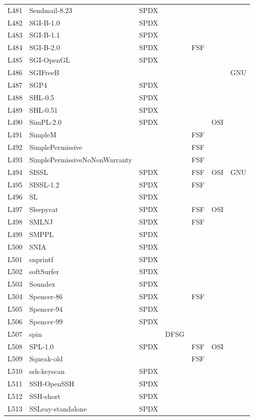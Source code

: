 \begin{longtable}[h]{m{2cm} | m{7cm} | c | c | c | c | c}
L481 & Sendmail-8.23 & SPDX &  &  &  &  \\
L482 & SGI-B-1.0 & SPDX &  &  &  &  \\
L483 & SGI-B-1.1 & SPDX &  &  &  &  \\
L484 & SGI-B-2.0 & SPDX &  & FSF &  &  \\
L485 & SGI-OpenGL & SPDX &  &  &  &  \\
L486 & SGIFreeB &  &  &  &  & GNU \\
L487 & SGP4 & SPDX &  &  &  &  \\
L488 & SHL-0.5 & SPDX &  &  &  &  \\
L489 & SHL-0.51 & SPDX &  &  &  &  \\
L490 & SimPL-2.0 & SPDX &  &  & OSI &  \\
L491 & SimpleM &  &  & FSF &  &  \\
L492 & SimplePermissive &  &  & FSF &  &  \\
L493 & SimplePermissiveNoNonWarranty &  &  & FSF &  &  \\
L494 & SISSL & SPDX &  & FSF & OSI & GNU \\
L495 & SISSL-1.2 & SPDX &  & FSF &  &  \\
L496 & SL & SPDX &  &  &  &  \\
L497 & Sleepycat & SPDX &  & FSF & OSI &  \\
L498 & SMLNJ & SPDX &  & FSF &  &  \\
L499 & SMPPL & SPDX &  &  &  &  \\
L500 & SNIA & SPDX &  &  &  &  \\
L501 & snprintf & SPDX &  &  &  &  \\
L502 & softSurfer & SPDX &  &  &  &  \\
L503 & Soundex & SPDX &  &  &  &  \\
L504 & Spencer-86 & SPDX &  & FSF &  &  \\
L505 & Spencer-94 & SPDX &  &  &  &  \\
L506 & Spencer-99 & SPDX &  &  &  &  \\
L507 & spin &  & DFSG &  &  &  \\
L508 & SPL-1.0 & SPDX &  & FSF & OSI &  \\
L509 & Squeak-old &  &  & FSF &  &  \\
L510 & ssh-keyscan & SPDX &  &  &  &  \\
L511 & SSH-OpenSSH & SPDX &  &  &  &  \\
L512 & SSH-short & SPDX &  &  &  &  \\
L513 & SSLeay-standalone & SPDX &  &  &  &  \\

\end{longtable}
